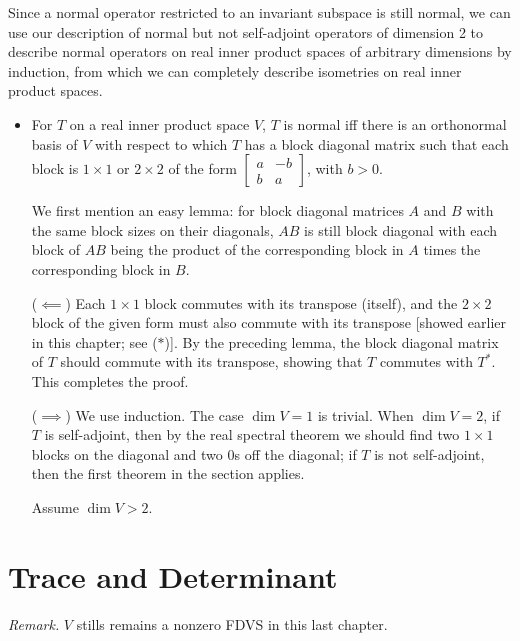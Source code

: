 \documentclass{article}
\renewcommand{\d}{\dim}
\begin{document}
Since a normal operator restricted to an invariant subspace is still normal, we can use our description of normal but not self-adjoint operators of dimension 2 to describe normal operators on real inner product spaces of arbitrary dimensions by induction, from which we can completely describe isometries on real inner product spaces.
\begin{itemize}
    \item For $T$ on a real inner product space $V$, $T$ is normal iff there is an orthonormal basis of $V$ with respect to which $T$ has a block diagonal matrix such that each block is $1 \times 1$ or $2 \times 2$ of the form $\begin{bmatrix}
        a & -b \\ b & a
    \end{bmatrix}$, with $b > 0$.
    
    We first mention an easy lemma: for block diagonal matrices $A$ and $B$ with the same block sizes on their diagonals, $AB$ is still block diagonal with each block of $AB$ being the product of the corresponding block in $A$ times the corresponding block in $B$.
    
    ($\impliedby$) Each $1 \times 1$ block commutes with its transpose (itself), and the $2 \times 2$ block of the given form must also commute with its transpose [showed earlier in this chapter; see ($\ast$)]. By the preceding lemma, the block diagonal matrix of $T$ should commute with its transpose, showing that $T$ commutes with $T^*$. This completes the proof.
    
    ($\implies$) We use induction. The case $\d V = 1$ is trivial. When $\d V = 2$, if $T$ is self-adjoint, then by the real spectral theorem we should find two $1 \times 1$ blocks on the diagonal and two 0s off the diagonal; if $T$ is not self-adjoint, then the first theorem in the section applies.
    
    Assume $\d V > 2$. 

    
\end{itemize}


\section{Trace and Determinant}
\textit{Remark.} $V$ stills remains a nonzero FDVS in this last chapter.

\setcounter{secnumdepth}{1}
\end{document}
